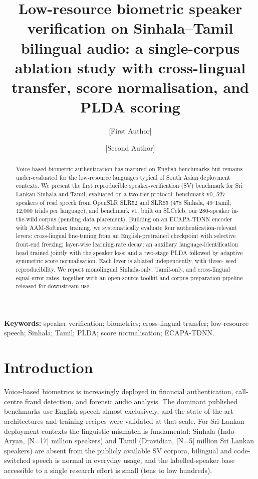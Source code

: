 \documentclass[11pt,a4paper]{article}
\title{Low-resource biometric speaker verification on Sinhala--Tamil
bilingual audio: a single-corpus ablation study with cross-lingual
transfer, score normalisation, and PLDA scoring}
\author[1]{[First Author]}
\author[1]{[Second Author]}
\affil[1]{[Department], [University], Sri Lanka. \\
\texttt{[email@institution]}}
\date{}
\begin{document}
\maketitle

\begin{abstract}
\noindent Voice-based biometric authentication has matured on English
benchmarks but remains under-evaluated for the low-resource languages
typical of South Asian deployment contexts. We present the first
reproducible speaker-verification (SV) benchmark for Sri Lankan Sinhala
and Tamil, evaluated on a two-tier protocol: benchmark v0, 527 speakers
of read speech from OpenSLR SLR52 and SLR65 (478 Sinhala, 49 Tamil;
12{,}000 trials per language), and benchmark v1, built on SLCeleb, our
280-speaker in-the-wild corpus (pending data placement).
Building on an ECAPA-TDNN encoder with AAM-Softmax training, we
systematically evaluate four authentication-relevant levers:
cross-lingual fine-tuning from an English-pretrained checkpoint with
selective front-end freezing; layer-wise learning-rate decay; an
auxiliary language-identification head trained jointly with the
speaker loss; and a two-stage PLDA followed by adaptive symmetric
score normalisation. Each lever is ablated independently, with three-
seed reproducibility. We report monolingual Sinhala-only, Tamil-only,
and cross-lingual equal-error rates, together with an open-source
toolkit and corpus-preparation pipeline released for downstream use.
\end{abstract}

\noindent \textbf{Keywords:} speaker verification; biometrics;
cross-lingual transfer; low-resource speech; Sinhala; Tamil; PLDA;
score normalisation; ECAPA-TDNN.

\section{Introduction}
\label{sec:intro}

Voice-based biometrics is increasingly deployed in financial
authentication, call-centre fraud detection, and forensic audio
analysis. The dominant published benchmarks
\cite{nagrani2017voxceleb} use English speech almost exclusively, and
the state-of-the-art architectures and training recipes
\cite{desplanques2020ecapa,deng2019arcface} were validated at that
scale. For Sri Lankan deployment contexts the linguistic mismatch is
fundamental: Sinhala (Indo-Aryan, [N=17] million speakers) and Tamil
(Dravidian, [N=5] million Sri Lankan speakers) are absent from the
publicly available SV corpora, bilingual and code-switched speech is
normal in everyday usage, and the labelled-speaker base accessible to
a single research effort is small (tens to low hundreds).
\end{document}

